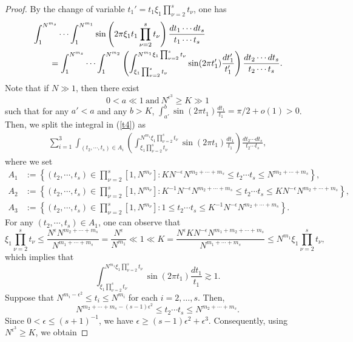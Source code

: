 \documentclass[11 pt,letterpaper]{amsart}
\theoremstyle{plain}
\theoremstyle{definition}
\theoremstyle{remark} \theoremstyle{exam} \theoremstyle{ob}
\numberwithin{equation}{section}
\begin{document}
\begin{proof}
 By the change of variable $t_1'=t_1 \xi_1 \prod_{\nu=2}^s t_\nu $, one has
\begin{align}\label{t4}
&\int_{1}^{N^{m_s}}  \cdots \int_{1}^{N^{m_1}}  \sin\left(2\pi \xi_1t_1 \prod_{\nu=2}^s t_\nu \right) \frac{dt_1\cdots dt_s}{t_1\cdots t_s}\notag\\
&\qquad=\int_{1}^{N^{m_s}}  \cdots \int_{1}^{N^{m_2}}\left(  \int_{\xi_1 \prod_{\nu=2}^s t_\nu  }^{N^{m_1}\xi_1 \prod_{\nu=2}^s t_\nu }\sin(2\pi t_1' ) \frac{dt_1'}{t_1'}\right) \frac{dt_2\cdots dt_s}{t_2\cdots t_s}.
\end{align} Note that  if $N\gg 1 $, then there exist  $$0<a\ll 1 \ \text{and} \  N^{\epsilon^{3}}\ge K\gg1$$ such  that  for any $a'<a$ and  any $b>K$,  $ \int_{a'}^{b }\sin(2\pi t_1 ) \frac{dt_1}{t_1}=\pi/2+o(1)>0$.
Then, we split  the integral in (\ref{t4}) as
 \begin{align*}
\sum_{i=1}^3 \int_{(t_2,\cdots,t_s)\in A_i}   \left( \int_{\xi_1 \prod_{\nu=2}^s t_\nu  }^{N^{m_1}\xi_1 \prod_{\nu=2}^s t_\nu }\sin(2\pi t_1 ) \frac{dt_1}{t_1}\right) \frac{dt_2\cdots dt_s}{t_2\cdots t_s},
\end{align*}
where we set
\begin{align*}
A_1&:=\left\{(t_2,\cdots, t_s)\in \prod_{\nu=2}^s[1,N^{m_\nu}]:   KN^{-\epsilon} N^{m_2+\cdots+m_s} \le t_2 \cdots t_s\le  N^{m_2+\cdots+m_s}\right\},\\
A_2&:=\left\{(t_2,\cdots, t_s)\in \prod_{\nu=2}^s[1,N^{m_\nu}]:  K^{-1}N^{-\epsilon}   N^{m_2+\cdots+m_s} \le t_2 \cdots t_s\le K N^{-\epsilon} N^{m_2+\cdots+m_s}\right\},\\
A_3&:=\left\{(t_2,\cdots, t_s)\in \prod_{\nu=2}^s[1,N^{m_\nu}]:   1\le t_2 \cdots t_s\le  K^{-1}N^{-\epsilon} N^{m_2+\cdots+m_s}\right\}.
\end{align*}
For any $(t_2,\cdots,t_s)\in A_1$, one can observe that 
$$  \xi_1 \prod_{\nu=2}^s t_\nu\le \frac{N^{\epsilon}  N^{m_2+\cdots+m_s} }{N^{m_1+\cdots+m_s}}=\frac{N^{\epsilon}}{N^{m_1}} \ll 1 \ll K= \frac{N^{\epsilon} K N^{-\epsilon} N^{m_1+m_2+\cdots+m_s}}{N^{m_1+\cdots+m_s}}\le 
N^{m_1} \xi_1 \prod_{\nu=2}^s t_\nu,   $$ which implies that $$\int_{\xi_1 \prod_{\nu=2}^s t_\nu  }^{N^{m_1}\xi_1 \prod_{\nu=2}^s t_\nu }\sin(2\pi t_1 ) \frac{dt_1}{t_1}\gtrsim 1 .$$
Suppose that $N^{m_i-\epsilon^2}\le t_i\le N^{m_i}$ for each $i=2,\dots,s.$ Then,
$$N^{m_2+\cdots+m_s-(s-1)\epsilon^2}
\le t_2\cdots t_s
\le N^{m_2+\cdots+m_s}.$$ Since $0<\epsilon\le (s+1)^{-1}$, we have
$\epsilon\ge (s-1)\epsilon^2+ \epsilon^3.$ Consequently, using $N^{\epsilon^3}\ge K$, we obtain

\end{proof}
\end{document}
